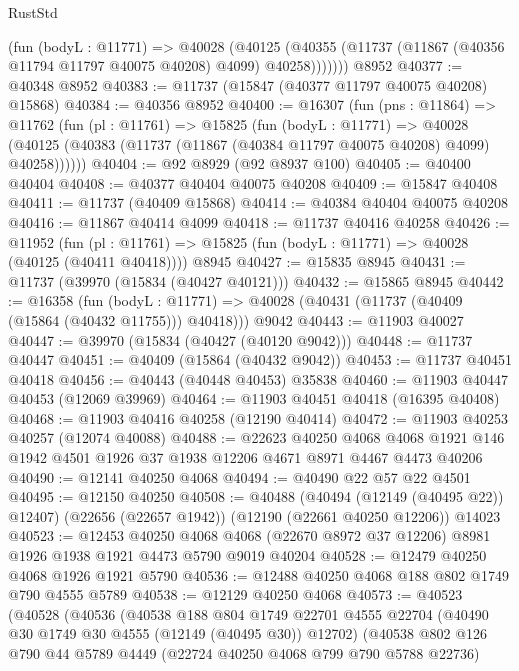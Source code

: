 \begin{lexlean}{RustStd}
\begin{coremodule}
          (fun (bodyL : @11771) =>
          @40028
            (@40125
              (@40355 (@11737 (@11867 (@40356 @11794 @11797 @40075 @40208) @4099) @40258)))))))
    @8952
@40377 := @40348 @8952
@40383 := @11737 (@15847 (@40377 @11797 @40075 @40208) @15868)
@40384 := @40356 @8952
@40400 := @16307
    (fun (pns : @11864) =>
    @11762
      (fun (pl : @11761) =>
      @15825
        (fun (bodyL : @11771) =>
        @40028 (@40125 (@40383 (@11737 (@11867 (@40384 @11797 @40075 @40208) @4099) @40258))))))
@40404 := @92 @8929 (@92 @8937 @100)
@40405 := @40400 @40404
@40408 := @40377 @40404 @40075 @40208
@40409 := @15847 @40408
@40411 := @11737 (@40409 @15868)
@40414 := @40384 @40404 @40075 @40208
@40416 := @11867 @40414 @4099
@40418 := @11737 @40416 @40258
@40426 := @11952
    (fun (pl : @11761) => @15825 (fun (bodyL : @11771) => @40028 (@40125 (@40411 @40418))))
    @8945
@40427 := @15835 @8945
@40431 := @11737 (@39970 (@15834 (@40427 @40121)))
@40432 := @15865 @8945
@40442 := @16358
    (fun (bodyL : @11771) => @40028 (@40431 (@11737 (@40409 (@15864 (@40432 @11755))) @40418)))
    @9042
@40443 := @11903 @40027
@40447 := @39970 (@15834 (@40427 (@40120 @9042)))
@40448 := @11737 @40447
@40451 := @40409 (@15864 (@40432 @9042))
@40453 := @11737 @40451 @40418
@40456 := @40443 (@40448 @40453) @35838
@40460 := @11903 @40447 @40453 (@12069 @39969)
@40464 := @11903 @40451 @40418 (@16395 @40408)
@40468 := @11903 @40416 @40258 (@12190 @40414)
@40472 := @11903 @40253 @40257 (@12074 @40088)
@40488 := @22623
    @40250
    @4068
    @4068
    @1921
    @146
    @1942
    @4501
    @1926
    @37
    @1938
    @12206
    @4671
    @8971
    @4467
    @4473
    @40206
@40490 := @12141 @40250 @4068
@40494 := @40490 @22 @57 @22 @4501
@40495 := @12150 @40250
@40508 := @40488
    (@40494 (@12149 (@40495 @22)) @12407)
    (@22656 (@22657 @1942))
    (@12190 (@22661 @40250 @12206))
    @14023
@40523 := @12453
    @40250
    @4068
    @4068
    (@22670 @8972 @37 @12206)
    @8981
    @1926
    @1938
    @1921
    @4473
    @5790
    @9019
    @40204
@40528 := @12479 @40250 @4068 @1926 @1921 @5790
@40536 := @12488 @40250 @4068 @188 @802 @1749 @790 @4555 @5789
@40538 := @12129 @40250 @4068
@40573 := @40523
    (@40528
      (@40536
        (@40538
          @188
          @804
          @1749
          @22701
          @4555
          @22704
          (@40490 @30 @1749 @30 @4555 (@12149 (@40495 @30)) @12702)
          (@40538
            @802
            @126
            @790
            @44
            @5789
            @4449
            (@22724 @40250 @4068 @799 @790 @5788 @22736)

\end{coremodule}
\end{lexlean}
